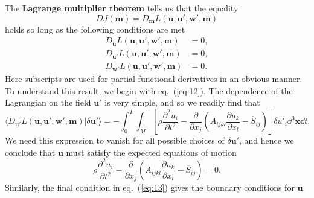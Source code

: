 The \textbf{Lagrange multiplier theorem} tells us that the equality
\begin{equation}
DJ(\mathbf{m})=D_{\mathbf{m}}L(\mathbf{u},\mathbf{u}',\mathbf{w}',\mathbf{m})
\label{eq:10}
\end{equation}
holds so long as the following conditions are met
\begin{align}
D_{\mathbf{u}}L(\mathbf{u},\mathbf{u}',\mathbf{w}',\mathbf{m})&=0, \label{eq:11} \\
D_{\mathbf{u}'}L(\mathbf{u},\mathbf{u}',\mathbf{w}',\mathbf{m})&=0, \label{eq:12} \\
D_{\mathbf{w}'}L(\mathbf{u},\mathbf{u}',\mathbf{w}',\mathbf{m})&=0.
\label{eq:13}
\end{align}
Here subscripts are used for partial functional derivatives in an obvious manner. To understand this result, 
we begin with eq.~(\ref{eq:12}). The dependence of the Lagrangian on the field $\mathbf{u}'$ is very simple, 
and so we readily find that
\begin{equation}
\langle D_{\mathbf{u}'}L(\mathbf{u},\mathbf{u}',\mathbf{w}',\mathbf{m})|\delta \mathbf{u}'\rangle = -\int_{0}^{T}\int_{M}\left[\rho\frac{\partial^{2}u_{i}}{\partial t^{2}}-\frac{\partial}{\partial x_{j}}\left(A_{ijkl}
\frac{\partial u_{k}}{\partial x_{l}}-\overline{S}_{ij}\right)\right]\delta u'_{i}\dd^{3}\mathbf{x}\dd t.
\label{eq:14}
\end{equation}
We need this expression to vanish for all possible choices of $\delta \mathbf{u}'$, and hence we 
conclude that $\mathbf{u}$ must satisfy the expected equations of motion
\begin{equation}
\rho\frac{\partial^{2}u_{i}}{\partial t^{2}}-\frac{\partial}{\partial x_{j}}\left(A_{ijkl}\frac{\partial u_{k}}{\partial x_{l}}-\overline{S}_{ij}\right)=0.
\label{eq:15}
\end{equation}
Similarly, the final condition in eq.~(\ref{eq:13}) gives the boundary conditions for $\mathbf{u}$. 

